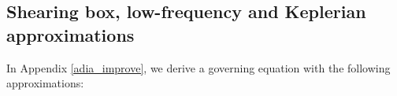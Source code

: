 



\subsection{Shearing box, low-frequency and Keplerian
  approximations}\label{approx_gov} 

In Appendix \ref{adia_improve}, we derive a governing equation with the following approximations:

